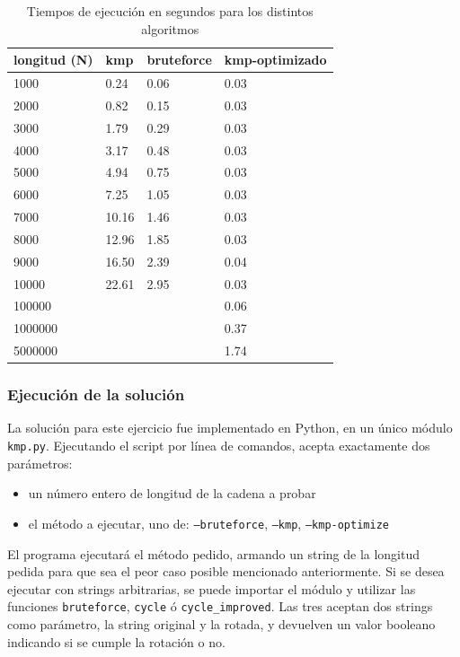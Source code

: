 \documentclass{article}
\begin{document}
\begin{table}[h]
    \begin{center}    

    \begin{tabular}{| l | l | l | l |}
        \hline
        longitud (N) & kmp & bruteforce & kmp-optimizado \\ \hline
        1000 & 0.24 & 0.06 & 0.03 \\ \hline
        2000 & 0.82 & 0.15 & 0.03 \\ \hline
        3000 & 1.79 & 0.29 & 0.03 \\ \hline
        4000 & 3.17 & 0.48 & 0.03 \\ \hline
        5000 & 4.94 & 0.75 & 0.03 \\ \hline
        6000 & 7.25 & 1.05 & 0.03 \\ \hline
        7000 & 10.16 & 1.46 & 0.03 \\ \hline
        8000 & 12.96 & 1.85 & 0.03 \\ \hline
        9000 & 16.50 & 2.39 & 0.04 \\ \hline
        10000 & 22.61 & 2.95 & 0.03 \\ \hline
        100000 &  &  & 0.06 \\ \hline
        1000000 &  &  & 0.37 \\ \hline
        5000000 &  &  & 1.74 \\ \hline
    \end{tabular}
    \caption{Tiempos de ejecución en segundos para los distintos algoritmos}
\end{center}
\end{table}

\subsubsection{Ejecución de la solución}
La solución para este ejercicio fue implementado en Python, en un único módulo \texttt{kmp.py}. Ejecutando el script por línea de comandos, acepta exactamente dos parámetros:
\begin{itemize}
    \item un número entero de longitud de la cadena a probar
    \item el método a ejecutar, uno de: \texttt{--bruteforce}, \texttt{--kmp}, \texttt{--kmp-optimize}
\end{itemize}
El programa ejecutará el método pedido, armando un string de la longitud pedida para que sea el peor caso posible mencionado anteriormente. Si se desea ejecutar con strings arbitrarias, se puede importar el módulo y utilizar las funciones \texttt{bruteforce}, \texttt{cycle} ó \texttt{cycle\_improved}. Las tres aceptan dos strings como parámetro, la string original y la rotada, y devuelven un valor booleano indicando si se cumple la rotación o no.
\end{document}
